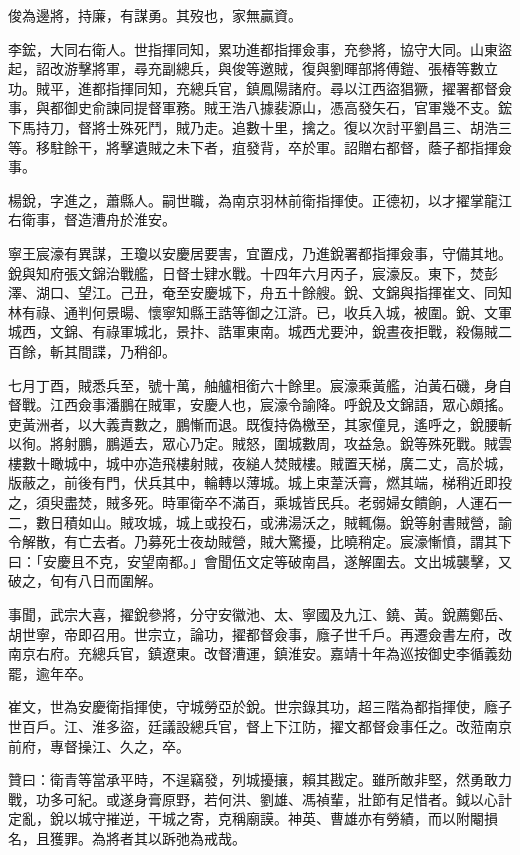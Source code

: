 \begin{pinyinscope}
俊為邊將，持廉，有謀勇。其歿也，家無贏資。

李鋐，大同右衛人。世指揮同知，累功進都指揮僉事，充參將，協守大同。山東盜起，詔改游擊將軍，尋充副總兵，與俊等邀賊，復與劉暉部將傅鎧、張椿等數立功。賊平，進都指揮同知，充總兵官，鎮鳳陽諸府。尋以江西盜猖獗，擢署都督僉事，與都御史俞諫同提督軍務。賊王浩八據裴源山，憑高發矢石，官軍幾不支。鋐下馬持刀，督將士殊死鬥，賊乃走。追數十里，擒之。復以次討平劉昌三、胡浩三等。移駐餘干，將擊遺賊之未下者，疽發背，卒於軍。詔贈右都督，蔭子都指揮僉事。

楊銳，字進之，蕭縣人。嗣世職，為南京羽林前衛指揮使。正德初，以才擢掌龍江右衛事，督造漕舟於淮安。

寧王宸濠有異謀，王瓊以安慶居要害，宜置戍，乃進銳署都指揮僉事，守備其地。銳與知府張文錦治戰艦，日督士肄水戰。十四年六月丙子，宸濠反。東下，焚彭澤、湖口、望江。己丑，奄至安慶城下，舟五十餘艘。銳、文錦與指揮崔文、同知林有祿、通判何景暘、懷寧知縣王誥等御之江滸。已，收兵入城，被圍。銳、文軍城西，文錦、有祿軍城北，景抃、誥軍東南。城西尤要沖，銳晝夜拒戰，殺傷賊二百餘，斬其間諜，乃稍卻。

七月丁酉，賊悉兵至，號十萬，舳艫相銜六十餘里。宸濠乘黃艦，泊黃石磯，身自督戰。江西僉事潘鵬在賊軍，安慶人也，宸濠令諭降。呼銳及文錦語，眾心頗搖。吏黃洲者，以大義責數之，鵬慚而退。既復持偽檄至，其家僮見，遙呼之，銳腰斬以徇。將射鵬，鵬遁去，眾心乃定。賊怒，圍城數周，攻益急。銳等殊死戰。賊雲樓數十瞰城中，城中亦造飛樓射賊，夜縋人焚賊樓。賊置天梯，廣二丈，高於城，版蔽之，前後有門，伏兵其中，輪轉以薄城。城上束葦沃膏，燃其端，梯稍近即投之，須臾盡焚，賊多死。時軍衛卒不滿百，乘城皆民兵。老弱婦女饋餉，人運石一二，數日積如山。賊攻城，城上或投石，或沸湯沃之，賊輒傷。銳等射書賊營，諭令解散，有亡去者。乃募死士夜劫賊營，賊大驚擾，比曉稍定。宸濠慚憤，謂其下曰：「安慶且不克，安望南都。」會聞伍文定等破南昌，遂解圍去。文出城襲擊，又破之，旬有八日而圍解。

事聞，武宗大喜，擢銳參將，分守安徽池、太、寧國及九江、鐃、黃。銳薦鄭岳、胡世寧，帝即召用。世宗立，論功，擢都督僉事，廕子世千戶。再遷僉書左府，改南京右府。充總兵官，鎮遼東。改督漕運，鎮淮安。嘉靖十年為巡按御史李循義劾罷，逾年卒。

崔文，世為安慶衛指揮使，守城勞亞於銳。世宗錄其功，超三階為都指揮使，廕子世百戶。江、淮多盜，廷議設總兵官，督上下江防，擢文都督僉事任之。改蒞南京前府，專督操江、久之，卒。

贊曰：衛青等當承平時，不逞竊發，列城擾攘，賴其戡定。雖所敵非堅，然勇敢力戰，功多可紀。或遂身膏原野，若何洪、劉雄、馮禎輩，壯節有足惜者。鉞以心計定亂，銳以城守摧逆，干城之寄，克稱廟謨。神英、曹雄亦有勞績，而以附閹損名，且獲罪。為將者其以跅弛為戒哉。


\end{pinyinscope}